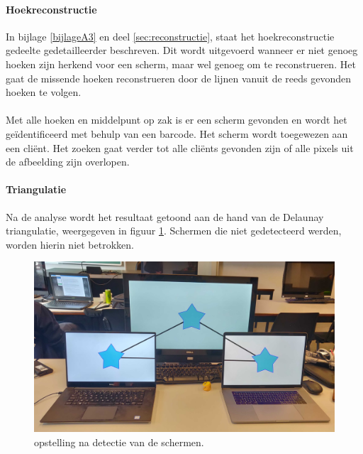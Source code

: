 \paragraph{Hoekreconstructie}
In bijlage \ref{bijlageA3} en deel \ref{sec:reconstructie}, staat het hoekreconstructie gedeelte gedetailleerder beschreven. Dit wordt uitgevoerd wanneer er niet genoeg hoeken zijn herkend voor een scherm, maar wel genoeg om te reconstrueren. Het gaat de missende hoeken reconstrueren door de lijnen vanuit de reeds gevonden hoeken te volgen.
\paragraph{}
Met alle hoeken en middelpunt op zak is er een scherm gevonden en wordt het geïdentificeerd met behulp van een barcode. Het scherm wordt toegewezen aan een cliënt. Het zoeken gaat verder tot alle cliënts gevonden zijn of alle pixels uit de afbeelding zijn overlopen.

\paragraph{Triangulatie}
Na de analyse wordt het resultaat getoond aan de hand van de Delaunay triangulatie, weergegeven in figuur \ref{fig:triang}. Schermen die niet gedetecteerd werden, worden hierin niet betrokken.
\begin{figure}[H]
	\centering
	\includegraphics[scale=0.09]{img/triang.jpg}
	\caption{opstelling na detectie van de schermen.}
	\label{fig:triang}
\end{figure}